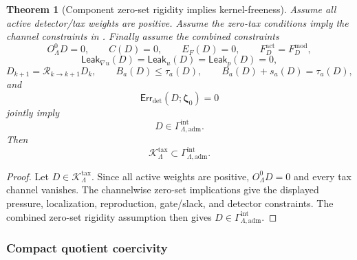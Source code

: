 \documentclass[11pt]{article}
\numberwithin{equation}{section}
\newtheorem{theorem}{Theorem}[section]
\theoremstyle{definition}
\theoremstyle{remark}
\newcommand{\adm}{\mathrm{adm}}
\newcommand{\detc}{\mathrm{det}}
\newcommand{\Err}{\mathsf{Err}}
\newcommand{\Leak}{\mathsf{Leak}}
\newcommand{\bzeta}{\boldsymbol\zeta}
\begin{document}
\begin{theorem}[Component zero-set rigidity implies kernel-freeness]
\label{thm:component-zero-set-kernel}
Assume all active detector/tax weights are positive.  Assume the zero-tax
conditions imply the channel constraints in
.
Finally assume the combined constraints
\[
    O^0_{\Lambda}D=0,\qquad
    C(D)=0,\qquad
    E_F(D)=0,\qquad
    F_D^{\mathrm{act}}=F_D^{\mathrm{mod}},
\]
\[
    \Leak_{\nabla u}(D)=\Leak_u(D)=\Leak_p(D)=0,
\]
\[
    D_{k+1}=\mathcal R_{k\to k+1}D_k,
    \qquad
    B_a(D)\le\tau_a(D),
    \qquad
    B_a(D)+s_a(D)=\tau_a(D),
\]
and
\[
    \Err_{\detc}(D;\bzeta_0)=0
\]
jointly imply
\[
    D\in\Gamma_{\Lambda,\adm}^{\mathrm{int}}.
\]
Then
\[
    \mathcal K_{\Lambda}^{\mathrm{tax}}
    \subset
    \Gamma_{\Lambda,\adm}^{\mathrm{int}}.
\]
\end{theorem}

\begin{proof}
Let \(D\in\mathcal K_{\Lambda}^{\mathrm{tax}}\).  Since all active weights are
positive, \(O^0_{\Lambda}D=0\) and every tax channel vanishes.  The channelwise
zero-set implications give the displayed pressure, localization, reproduction,
gate/slack, and detector constraints.  The combined zero-set rigidity assumption
then gives \(D\in\Gamma_{\Lambda,\adm}^{\mathrm{int}}\).
\end{proof}

\subsubsection{Compact quotient coercivity}
\end{document}
